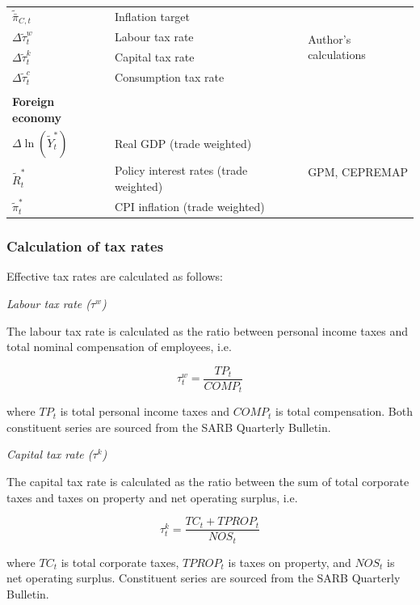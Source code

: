 \documentclass[a4paper,11pt]{article}
\numberwithin{equation}{section}
\begin{document}
\begin{table}[t]
\begin{tabular}{p{3.3cm} p{6.5cm} p{0.2cm} p{4.5cm}}
			$\tilde{\bar{\pi}}_{C,t}$ & Inflation target && \multirow{4}{4.5cm}{Author's calculations} \\
			$\Delta\tilde{\tau}^w_t$ & Labour tax rate && \\
			$\Delta\tilde{\tau}^k_t$ & Capital tax rate && \\
			$\Delta\tilde{\tau}^c_t$ & Consumption tax rate && \\
			&&& \\
			\textbf{Foreign economy} && & \\
			$\Delta\ln(\tilde{Y}_t^*)$ & Real GDP (trade weighted) && \multirow{3}{4.5cm}{GPM, CEPREMAP}\\
			$\tilde{R}_t^*$ & Policy interest rates (trade weighted) && \\
			$\tilde{\pi}_t^*$ & CPI inflation (trade weighted) && \\
			\toprule
		\end{tabular}
		\label{tab_obs}
	\end{table}
	
	\subsubsection{Calculation of tax rates}
	Effective tax rates are calculated as follows:

	\textit{Labour tax rate ($\tau^w$)}

	The labour tax rate is calculated as the ratio between personal income taxes and total nominal compensation of employees, i.e.
	
	\begin{equation}
		\tau^w_t = \frac{TP_t}{COMP_t}
	\end{equation}
	
	where $TP_t$ is total personal income taxes and $COMP_t$ is total compensation. Both constituent series are sourced from the SARB Quarterly Bulletin.
	
	\textit{Capital tax rate ($\tau^k$)}
	
	The capital tax rate is calculated as the ratio between the sum of total corporate taxes and taxes on property and net operating surplus, i.e.
	
	\begin{equation}
	\tau^k_t = \frac{TC_t + TPROP_t}{NOS_t}
	\end{equation}
	
	where $TC_t$ is total corporate taxes, $TPROP_t$ is taxes on property, and $NOS_t$ is net operating surplus. Constituent series are sourced from the SARB Quarterly Bulletin.
	
\end{document}
